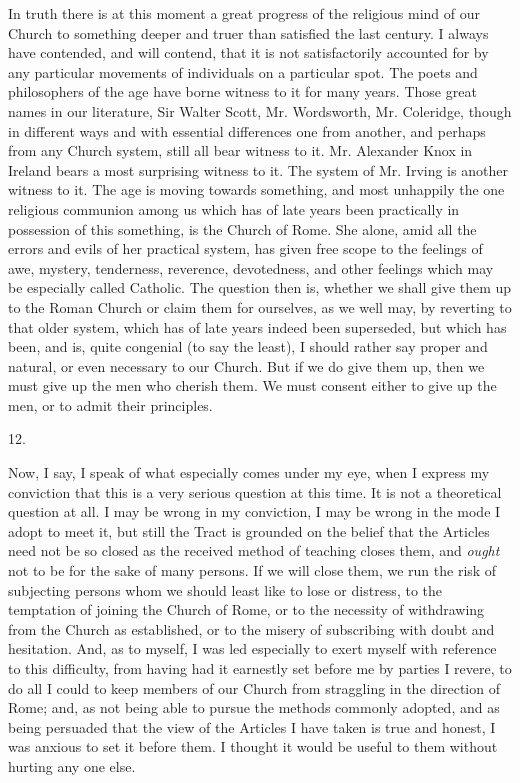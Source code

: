 In truth there is at this moment a great progress
of the religious mind of our Church to something deeper and truer than
satisfied the last century. I always have contended, and will contend,
that it is not satisfactorily accounted for by any particular
movements of individuals on a particular spot. The poets and
philosophers of the age have borne witness to it for many years. Those
great names in our literature, Sir Walter Scott, Mr. Wordsworth, Mr.
Coleridge, though in different ways and with essential differences one
from another, and perhaps from any Church system, still all bear
witness to it. Mr. Alexander Knox in Ireland bears a most surprising
witness to it. The system of Mr. Irving is another witness to it. The
age is moving towards something, and most unhappily the one religious
communion among us which has of late years been practically in
possession of this something, is the Church of Rome. She alone, amid
all the errors and evils of her practical system, has given free scope
to the feelings of awe, mystery, tenderness, reverence, devotedness,
and other feelings which may be especially called Catholic. The
question then is, whether we shall give them up to the Roman Church or
claim them for ourselves, as we well may, by reverting to that older
system, which has of late years indeed been superseded, but which has
been, and is, quite congenial (to say the least), I should rather say
proper and natural, or even necessary to our Church. But if we
do give them up, then we must give up the men who cherish them. We
must consent either to give up the men, or to admit their principles.

12.

Now, I say, I speak of what especially comes
under my eye, when I express my conviction that this is a very serious
question at this time. It is not a theoretical question at all. I may
be wrong in my conviction, I may be wrong in the mode I adopt to meet
it, but still the Tract is grounded on the belief that the Articles
need not be so closed as the received method of teaching closes them,
and \emph{ought} not to be for the sake of many persons. If we will
close them, we run the risk of subjecting persons whom we should least
like to lose or distress, to the temptation of joining the Church of
Rome, or to the necessity of withdrawing from the Church as
established, or to the misery of subscribing with doubt and
hesitation. And, as to myself, I was led especially to exert myself
with reference to this difficulty, from having had it earnestly set
before me by parties I revere, to do all I could to keep members of
our Church from straggling in the direction of Rome; and, as not being
able to pursue the methods commonly adopted, and as being persuaded
that the view of the Articles I have taken is true and honest, I was
anxious to set it before them. I thought it would be useful to them
without hurting any one else.

